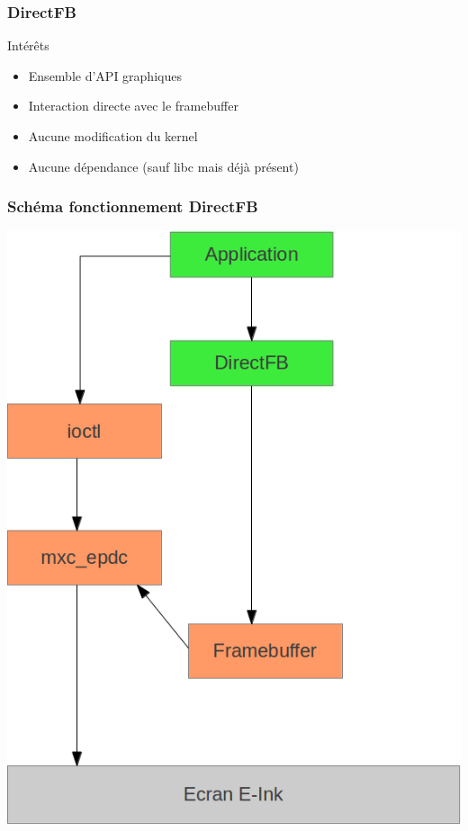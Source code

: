 \begin{frame}
\frametitle{DirectFB}

\begin{block}{Intérêts}
\begin{itemize}
\item Ensemble d'API graphiques
\item Interaction directe avec le framebuffer 
\item Aucune modification du kernel
\item Aucune dépendance (sauf libc mais déjà présent)
\end{itemize}
\end{block}

\end{frame}

\begin{frame}
\frametitle{Schéma fonctionnement DirectFB}

\begin{center}
\includegraphics[scale=0.3]{schema_direct_fb.png}
\end{center}

\end{frame}

